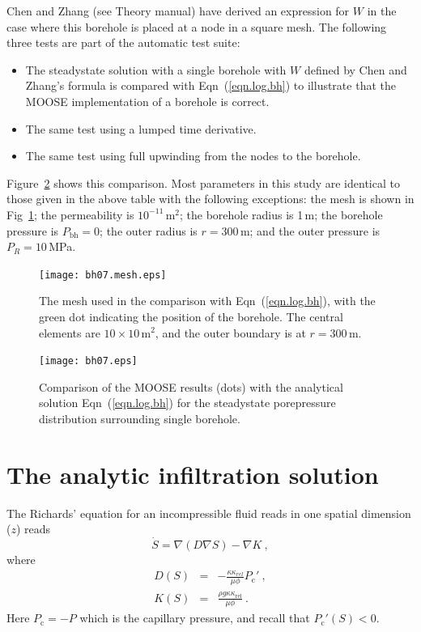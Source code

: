 \documentclass[]{scrreprt}
\begin{document}
Chen and Zhang (see Theory manual) have derived an expression for $W$
in the case where this borehole is placed at a node in a square mesh.
The following three tests are part of the automatic test suite:
\begin{itemize}
\item The steadystate solution with a single borehole with $W$ defined by
Chen and Zhang's formula is compared with Eqn~(\ref{eqn.log.bh}) to
illustrate that the MOOSE implementation of a borehole is correct.
\item The same test using a lumped time derivative.
\item The same test using full upwinding from the nodes to the borehole.
\end{itemize}
Figure~\ref{bh07.fig} shows this comparison.  Most parameters in this
study are identical to those given in the above table with the
following exceptions: the mesh is shown in Fig~\ref{bh07.mesh.fig};
the permeability is $10^{-11}$\,m$^{2}$; the borehole radius is 1\,m;
the borehole pressure is $P_{\mathrm{bh}}=0$; the outer radius is
$r=300$\,m; and the outer pressure is $P_{R}=10$\,MPa.

\begin{figure}[htb]
\centering
\texttt{[image: bh07.mesh.eps]}
\caption{The mesh used in the comparison with Eqn~(\ref{eqn.log.bh}),
  with the green dot indicating the position of the borehole.
  The central elements are $10\times 10$\,m$^{2}$, and the outer
  boundary is at $r=300$\,m.}
\label{bh07.mesh.fig}
\end{figure}



\begin{figure}[htb]
\centering
\texttt{[image: bh07.eps]}
\caption{Comparison of the MOOSE results (dots) with the analytical
  solution Eqn~(\ref{eqn.log.bh}) for the steadystate porepressure
  distribution surrounding single borehole.}
\label{bh07.fig}
\end{figure}





\chapter{The analytic infiltration solution}
\label{bw}

The Richards' equation for an incompressible fluid reads in one
spatial dimension ($z$) reads 
\begin{equation}
\dot{S} = \nabla \left(D \nabla S\right) - \nabla K \ ,
\end{equation}
where
\begin{eqnarray}
D(S) & = & -\frac{\kappa \kappa_{rel}}{\mu\phi}P_{\mathrm{c}}' \ ,
\\
K(S) & = &\frac{\rho g \kappa\kappa_{\mathrm{rel}}}{\mu\phi} \ .
\end{eqnarray}
Here $P_{\mathrm{c}} = -P$ which is the capillary pressure, and recall
that $P_{\mathrm{c}}'(S)<0$.
\end{document}
